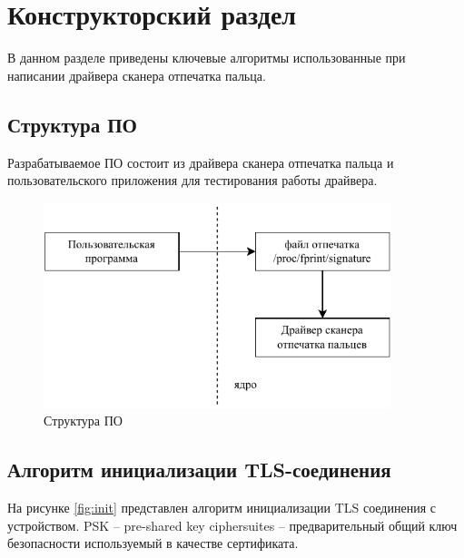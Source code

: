\chapter{Конструкторский раздел}

В данном разделе приведены ключевые алгоритмы использованные при написании драйвера сканера отпечатка пальца.

\section{Структура ПО}

Разрабатываемое ПО состоит из драйвера сканера отпечатка пальца и пользовательского приложения для тестирования работы драйвера.

\begin{figure}[h!]
    \centering
    \includegraphics[width=0.9\textwidth]{img/structure-po}
    \caption{Структура ПО}
\end{figure}

\clearpage

\section{Алгоритм инициализации TLS-соединения}

На рисунке \ref{fig:init} представлен алгоритм инициализации TLS соединения с устройством. PSK \cite{psk} -- pre-shared key ciphersuites -- предварительный общий ключ безопасности используемый в качестве сертификата.

